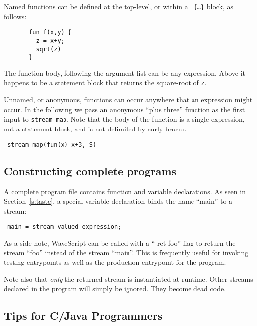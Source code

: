 \documentclass[twocolumn]{report}
\newcommand{\ws}{WaveScript}
\newenvironment{wscode}{\begin{center}\tt}{\end{center}}
\begin{document}
Named functions can be defined at the top-level, or within a {\tt
  \{\ldots\}} block, as follows:
\begin{verbatim}
       fun f(x,y) {
         z = x+y;
         sqrt(z)
       }
\end{verbatim}

The function body, following the argument list can be any expression.
Above it happens to be a statement block that returns the
square-root of {\tt z}.

Unnamed, or anonymous, functions can occur anywhere that an expression
might occur. In the following we pass an anonymous ``plus three''
function as the first input to {\tt stream\_map}.  Note that the body
of the function is a single expression, not a statement block, and is
not delimited by curly braces.

\begin{wscode}
stream\_map(fun(x) x+3, S)
\end{wscode}

\subsection{Constructing complete programs}

A complete program file contains function and variable declarations.
As seen in Section~\ref{s:taste}, a special variable declaration
binds the name ``main'' to a stream:
\begin{wscode}
main = stream-valued-expression;
\end{wscode}
As a side-note, {\ws} can be called with a ``-ret foo'' flag to return
the stream ``foo'' instead of the stream ``main''.  This is frequently
useful for invoking testing entrypoints as well as the production
entrypoint for the program.  

Note also that {\em only} the returned stream is instantiated at runtime.
Other streams declared in the program will simply be ignored.  They
become dead code.



\subsection{Tips for C/Java Programmers}
\end{document}
